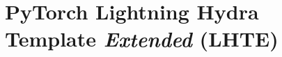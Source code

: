 

\section[toc={Lightning Hydra Template \emph{Ext}}]{{PyTorch Lightning Hydra Template \emph{Extended} (LHTE)}}

\begin{emptyslide}[toc={}]{}
\vspace{-1.44em}
\end{emptyslide}


